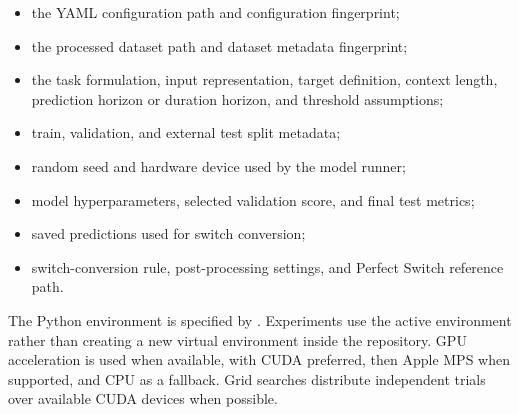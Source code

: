 \begin{itemize}
  \item the YAML configuration path and configuration fingerprint;
  \item the processed dataset path and dataset metadata fingerprint;
  \item the task formulation, input representation, target definition, context
  length, prediction horizon or duration horizon, and threshold assumptions;
  \item train, validation, and external test split metadata;
  \item random seed and hardware device used by the model runner;
  \item model hyperparameters, selected validation score, and final test
  metrics;
  \item saved predictions used for switch conversion;
  \item switch-conversion rule, post-processing settings, and Perfect Switch
  reference path.
\end{itemize}

The Python environment is specified by . Experiments use
the active environment rather than creating a new virtual environment inside
the repository. GPU acceleration is used when available, with CUDA preferred,
then Apple MPS when supported, and CPU as a fallback. Grid searches distribute
independent trials over available CUDA devices when possible.
